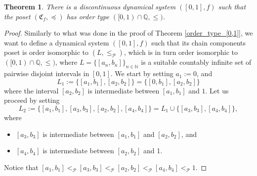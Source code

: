 \documentclass[pdflatex,sn-mathphys-num]{sn-jnl}
\theoremstyle{thmstyleone}%
\newtheorem{thm}{Theorem}
\theoremstyle{thmstyletwo}%
\theoremstyle{thmstylethree}%
\begin{document}
\begin{thm}\label{order_nomin}
There is a discontinuous dynamical system $([0,1],f)$ such that the poset $(\mathfrak{C}_f,\preceq)$ has order type $([0,1)\cap\mathbb{Q},\leq)$.
\end{thm}
\begin{proof} 
Similarly to what was done in the proof of Theorem \ref{order_type_[0,1]}, we want to define a dynamical system $([0,1],f)$ such that its chain components poset is order isomorphic to $(L,\leq_\mathcal{P})$, which is in turn order isomorphic to $([0,1)\cap \mathbb{Q}, \leq)$, where $L=\{[a_n,b_n]\}_{n\in\mathbb{N}}$ is a suitable countably infinite set of pairwise disjoint intervals in $[0,1]$.
We start by setting $a_1:=0$, and
\[
L_1:=\{[a_1,b_1], [a_2,b_2]\}=\{[0,b_1], [a_2,b_2]\}
\]
where the interval $[a_2,b_2]$ is intermediate between $[a_1,b_1]$ and $1$.
Let us proceed by setting
\[
L_2:=\{[a_1,b_1], [a_3,b_3],[a_2,b_2], [a_4,b_4]\}=L_1\cup\{[a_3,b_3],[a_4,b_4]\},
\]
where 
\begin{itemize}
\item $[a_3,b_3]$ is intermediate between $[a_1,b_1]$ and $[a_2,b_2]$, and
\item $[a_4,b_4]$ is intermediate between $[a_2,b_2]$ and 1.
\end{itemize}
Notice that $[a_1,b_1]<_\mathcal{P} [a_3,b_3] <_\mathcal{P} [a_2,b_2] <_\mathcal{P} [a_4,b_4] <_\mathcal{P} 1$.


\end{proof}
\end{document}
